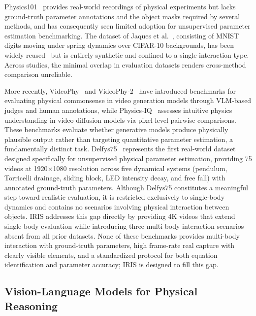 \documentclass[runningheads]{llncs}
\begin{document}
Physics101~\cite{wu2016physics} provides real-world recordings of physical experiments but lacks ground-truth parameter annotations and the object masks required by several methods, and has consequently seen limited adoption for unsupervised parameter estimation benchmarking. The dataset of Jaques et al.~\cite{jaques2019physics}, consisting of MNIST digits moving under spring dynamics over CIFAR-10 backgrounds, has been widely reused~\cite{hofherr2023neural} but is entirely synthetic and confined to a single interaction type. Across studies, the minimal overlap in evaluation datasets renders cross-method comparison unreliable.

More recently, VideoPhy~\cite{bansal2024videophy} and VideoPhy-2~\cite{bansal2025videophy} have introduced benchmarks for evaluating physical commonsense in video generation models through VLM-based judges and human annotations, while Physics-IQ~\cite{motamed2026generative} assesses intuitive physics understanding in video diffusion models via pixel-level pairwise comparisons. These benchmarks evaluate whether generative models produce physically plausible output rather than targeting quantitative parameter estimation, a fundamentally distinct task. Delfys75~\cite{garcia2025learning} represents the first real-world dataset designed specifically for unsupervised physical parameter estimation, providing 75 videos at 1920$\times$1080 resolution across five dynamical systems (pendulum, Torricelli drainage, sliding block, LED intensity decay, and free fall) with annotated ground-truth parameters. Although Delfys75 constitutes a meaningful step toward realistic evaluation, it is restricted exclusively to single-body dynamics and contains no scenarios involving physical interaction between objects. IRIS addresses this gap directly by providing 4K videos that extend single-body evaluation while introducing three multi-body interaction scenarios absent from all prior datasets. None of these benchmarks provides multi-body interaction with ground-truth parameters, high frame-rate real capture with clearly visible elements, and a standardized protocol for both equation identification and parameter accuracy; IRIS is designed to fill this gap.

\subsection{Vision-Language Models for Physical Reasoning}
\label{sec:related_vlm}
\end{document}

